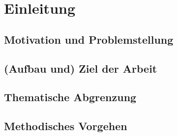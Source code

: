 \chapter{Einleitung}

\section{Motivation und Problemstellung}

\section{(Aufbau und) Ziel der Arbeit}

\section{Thematische Abgrenzung}

\section{Methodisches Vorgehen}